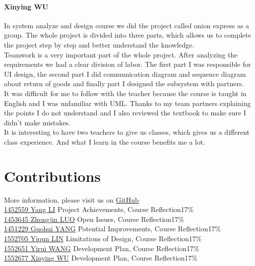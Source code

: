 \documentclass[12pt]{scrreprt}
\begin{document}
\subsubsection{Xinying WU}
In system analyze and design course we did the project called onion express as a group. The whole project is divided into three parts, which allows us to complete the project step by step and better understand the knowledge.\\
Teamwork is a very important part of the whole project. After analyzing the requirements we had a clear division of labor. The first part I was responsible for UI design, the second part I did communication diagram and sequence diagram about return of goods and finally part I designed the subsystem with partners.\\
It was difficult for me to follow with the teacher because the course is taught in English and I was unfamiliar with UML. Thanks to my team partners explaining the points I do not understand and I also reviewed the textbook to make sure I didn't make mistakes.\\
It is interesting to have two teachers to give us classes, which gives us a different class experience. And what I learn in the course benefits me a lot.

\chapter{Contributions}
More information, please visit us on \href{https://github.com/zjzsliyang/OnionExpress}{GitHub}
\vspace{3mm}\\
\href{https://github.com/zjzsliyang}{{\color{blue}1452559 Yang LI}} \hspace{17mm} Project Achievements, Course Reflection\hfill 17\%\\
\href{https://github.com/tjluozhongjin}{{\color{blue}1453645 Zhongjin LUO}} \hspace{5mm} Open Issues, Course Reflection\hfill 17\%\\
\href{https://github.com/Yghifi}{{\color{blue}1451229 Guohui YANG}} \hspace{4.5mm} Potential Improvements, Course Reflection\hfill 17\%\\
\href{https://github.com/lyqun}{{\color{blue}1552705 Yiqun LIN}} \hspace{12mm} Limitations of Design, Course Reflection\hfill 17\%\\
\href{https://github.com/Charon0622}{{\color{blue}1552651 Yirui WANG}} \hspace{7.5mm} Development Plan, Course Reflection\hfill 17\%\\
\href{https://github.com/CandiceGemini}{{\color{blue}1552677 Xinying WU}} \hspace{8.5mm} Development Plan, Course Reflection\hfill 17\%
\end{document}
